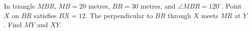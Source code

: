 In triangle $MBR$, $MB=20$ metres, $BR=30$ metres, and $\angle MBR=120^\circ$. Point $X$ on $BR$ satisfies $BX=12$. The perpendicular to $BR$ through $X$ meets $MR$ at $Y$. Find $MY$ and $XY$.
